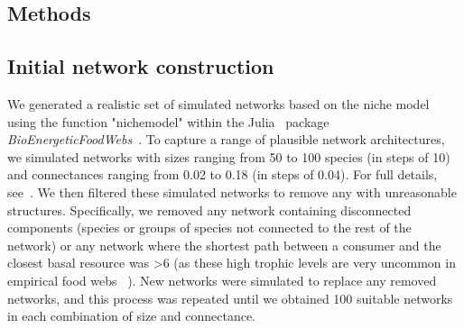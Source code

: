 \documentclass[12pt]{article}
\begin{document}
\begin{spacing}{2.0}
 
    


    	
\section*{Methods}

	\subsection*{Initial network construction}

		We generated a realistic set of simulated networks based on the niche model~\citep{Williams2000,Stouffer2007} using the function "nichemodel" within the Julia~\citep{Julia} package \emph{BioEnergeticFoodWebs}~\citep{bioenergfw,Delmas2017}. 
		To capture a range of plausible network architectures, we simulated networks with sizes ranging from 50 to 100 species (in steps of 10) and connectances ranging from 0.02 to 0.18 (in steps of 0.04). 
		For full details, see~\citet{Cirtwill2021_inprep}.
        We then filtered these simulated networks to remove any with unreasonable structures.
		Specifically, we removed any network containing disconnected components (species or groups of species not connected to the rest of the network) or any network where the shortest path between a consumer and the closest basal resource was \textgreater6 (as these high trophic levels are very uncommon in empirical food webs ~\citep{}).
		New networks were simulated to replace any removed networks, and this process was repeated until we obtained 100 suitable networks in each combination of size and connectance.
              

\end{spacing}
\end{document}
